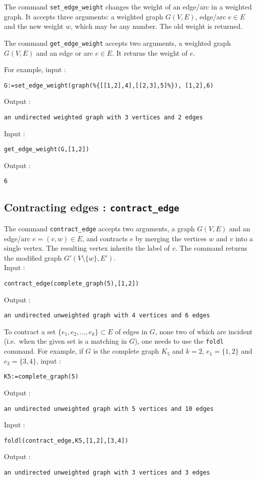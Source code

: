 \documentclass[a4paper,11pt]{article}
\begin{document}
The command {\tt set\_edge\_weight} changes the weight of an edge/arc in a weighted graph. It accepts three arguments: a weighted graph $ G(V,E) $, edge/arc $ e\in E $ and the new weight $ w $, which may be any number. The old weight is returned.

The command {\tt get\_edge\_weight} accepts two arguments, a weighted graph $ G(V,E) $ and an edge or arc $ e\in E $. It returns the weight of $ e $.

For example, input :
\begin{center}
  \tt G:=set\_edge\_weight(graph(\%\{[[1,2],4],[[2,3],5]\%\}), [1,2],6)
\end{center}
Output :
\begin{center}
  \tt an undirected weighted graph with 3 vertices and 2 edges
\end{center}
Input :
\begin{center}
  \tt get\_edge\_weight(G,[1,2])
\end{center}
Output :
\begin{center}
  \tt 6
\end{center}

\subsection{Contracting edges : {\tt contract\_edge}}

The command {\tt contract\_edge} accepts two arguments, a graph $ G(V,E) $ and an edge/arc $ e=(v,w)\in E $, and contracts $ e $ by merging the vertices $ w $ and $ v $ into a single vertex. The resulting vertex inherits the label of $ v $. The command returns the modified graph $ G'(V\setminus\{w\},E') $.\\
Input :
\begin{center}
  \tt contract\_edge(complete\_graph(5),[1,2])
\end{center}
Output :
\begin{center}
  \tt an undirected unweighted graph with 4 vertices and 6 edges
\end{center}

To contract a set $ \{e_1,e_2,\dots,e_k\}\subset E $ of edges in $ G $, none two of which are incident (i.e.~when the given set is a matching in $ G $), one needs to use the {\tt foldl} command. For example, if $ G $ is the complete graph $ K_5 $ and $ k=2 $, $ e_1=\{1,2\} $ and $ e_2=\{3,4\} $, input :
\begin{center}
  \tt K5:=complete\_graph(5)
\end{center}
Output :
\begin{center}
  \tt an undirected unweighted graph with 5 vertices and 10 edges
\end{center}
Input :
\begin{center}
  \tt foldl(contract\_edge,K5,[1,2],[3,4])
\end{center}
Output :
\begin{center}
  \tt an undirected unweighted graph with 3 vertices and 3 edges
\end{center}
\end{document}
